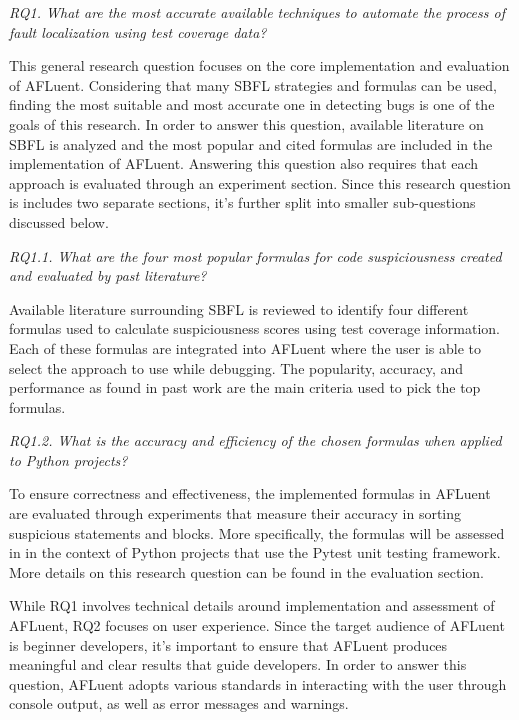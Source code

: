 \begin{center}
	\emph{RQ1. What are the most accurate available techniques to automate the process of
	fault localization using test coverage data?
	}
\end{center}
\label{para:RQ1}

This general research question focuses on the core implementation and
evaluation of AFLuent. Considering that many SBFL strategies and formulas can be
used, finding the most suitable and most accurate one in detecting bugs is one
of the goals of this research. In order to answer this question,
available literature on SBFL is analyzed and the most popular and cited formulas
are included in the implementation of AFLuent. Answering this question also
requires that each approach is evaluated through an experiment section.
Since this research question is includes two separate sections, it's further split into
smaller sub-questions discussed below.

\begin{center}
	\emph{RQ1.1. What are the four most popular formulas for code suspiciousness
	created and evaluated by past literature?
	}
\end{center}
\label{para:RQ1.1}

Available literature surrounding SBFL is reviewed to identify four
different formulas used to calculate suspiciousness scores using test coverage
information. Each of these formulas are integrated into AFLuent where the user
is able to select the approach to use while debugging. The popularity, accuracy,
and performance as found in past work are the main criteria used to pick the top
formulas.


\begin{center}
	\emph{RQ1.2.  What is the accuracy and efficiency of the chosen
	formulas when applied to Python projects?
	}
\end{center}
\label{para:RQ1.2}

To ensure correctness and effectiveness, the implemented formulas in AFLuent are
evaluated through experiments that measure their accuracy in sorting suspicious
statements and blocks. More specifically, the formulas will be assessed in in
the context of Python projects that use the Pytest unit testing framework.
More details on this research question can be found in the evaluation section.

While RQ1 involves technical details around implementation and assessment of
AFLuent, RQ2 focuses on user experience. Since the target audience of AFLuent is
beginner developers, it's important to ensure that AFLuent produces meaningful
and clear results that guide developers. In order to answer this question,
AFLuent adopts various standards in interacting with the user through console
output, as well as error messages and warnings.

